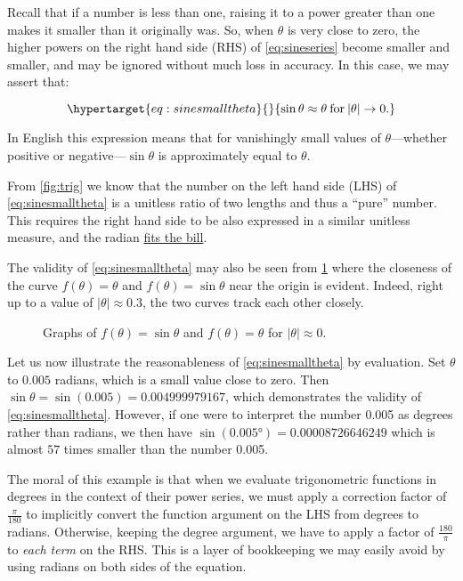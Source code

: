 \documentclass[
  a4paper,
]{article}
\begin{document}
Recall that if a number is less than one, raising it to a power greater
than one makes it smaller than it originally was. So, when \(\theta\) is
very close to zero, the higher powers on the right hand side (RHS) of
\cref{eq:sineseries} become smaller and smaller, and may be ignored
without much loss in accuracy. In this case, we may assert that:

\begin{equation}\protect\hypertarget{eq:sinesmalltheta}{}{
\sin\theta\approx\theta \:\text{for}\: \lvert\theta\rvert \to 0.
}\label{eq:sinesmalltheta}\end{equation}

In English this expression means that for vanishingly small values of
\(\theta\)---whether positive or negative---\(\sin\theta\) is
approximately equal to \(\theta\).

From \cref{fig:trig} we know that the number on the left hand side (LHS)
of \cref{eq:sinesmalltheta} is a unitless ratio of two lengths and thus
a ``pure'' number. This requires the right hand side to be also
expressed in a similar unitless measure, and the radian
\href{https://www.collinsdictionary.com/dictionary/english/fit-the-bill}{fits
the bill}.

The validity of \cref{eq:sinesmalltheta} may also be seen from
\cref{fig:xsinx} where the closeness of the curve \(f(\theta) = \theta\)
and \(f(\theta) = \sin\theta\) near the origin is evident. Indeed, right
up to a value of \(\lvert\theta\rvert\approx 0.3\), the two curves track
each other closely.

\begin{figure}
\hypertarget{fig:xsinx}{%
\centering

\caption{Graphs of \(f(\theta)= \sin\theta\) and \(f(\theta) = \theta\)
for \(\lvert\theta\rvert\approx 0\).}\label{fig:xsinx}
}
\end{figure}

Let us now illustrate the reasonableness of \cref{eq:sinesmalltheta} by
evaluation. Set \(\theta\) to \(0.005\) radians, which is a small value
close to zero. Then \(\sin\theta = \sin(0.005) = 0.004999979167\), which
demonstrates the validity of \cref{eq:sinesmalltheta}. However, if one
were to interpret the number 0.005 as degrees rather than radians, we
then have \(\sin(0.005°) = 0.00008726646249\) which is almost \(57\)
times smaller than the number 0.005.

The moral of this example is that when we evaluate trigonometric
functions in degrees in the context of their power series, we must apply
a correction factor of \(\frac{\pi}{180}\) to implicitly convert the
function argument on the LHS from degrees to radians. Otherwise, keeping
the degree argument, we have to apply a factor of \(\frac{180}{\pi}\) to
\emph{each term} on the RHS. This is a layer of bookkeeping we may
easily avoid by using radians on both sides of the equation.
\end{document}

